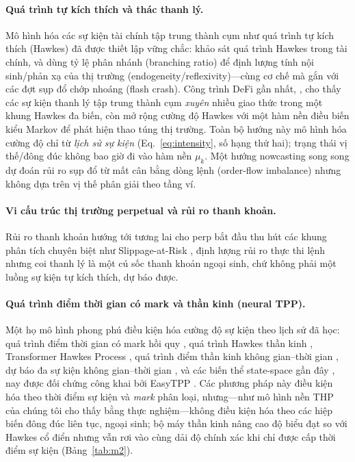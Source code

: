 \documentclass[11pt,a4paper]{article}
\begin{document}
\paragraph{Quá trình tự kích thích và thác thanh lý.} Mô hình hóa các sự kiện tài chính tập trung thành cụm như quá trình tự kích thích (Hawkes) đã được thiết lập vững chắc: \citet{bacry2015hawkes} khảo sát quá trình Hawkes trong tài chính, và \citet{hardiman2013endogeneity} dùng tỷ lệ phân nhánh (branching ratio) để định lượng tính nội sinh/phản xạ của thị trường (endogeneity/reflexivity)---cùng cơ chế mà \citet{filimonov2012reflexivity} gắn với các đợt sụp đổ chớp nhoáng (flash crash). Công trình DeFi gần nhất, \citet{cao2025defi}, cho thấy các sự kiện thanh lý tập trung thành cụm \emph{xuyên} nhiều giao thức trong một khung Hawkes đa biến, còn \citet{markovhawkes2025manipulation} mở rộng cường độ Hawkes với một hàm nền điều biến kiểu Markov để phát hiện thao túng thị trường. Toàn bộ hướng này mô hình hóa cường độ chỉ từ \emph{lịch sử sự kiện} (Eq.~\eqref{eq:intensity}, số hạng thứ hai); trạng thái vị thế/đông đúc không bao giờ đi vào hàm nền $\mu_k$. Một hướng nowcasting song song \citep{nowcast2023crashrisk} dự đoán rủi ro sụp đổ từ mất cân bằng dòng lệnh (order-flow imbalance) nhưng không dựa trên vị thế phân giải theo tầng ví.

\paragraph{Vi cấu trúc thị trường perpetual và rủi ro thanh khoản.} Rủi ro thanh khoản hướng tới tương lai cho perp bắt đầu thu hút các khung phân tích chuyên biệt như Slippage-at-Risk \citep{slippageatrisk2026}, định lượng rủi ro thực thi lệnh nhưng coi thanh lý là một cú sốc thanh khoản ngoại sinh, chứ không phải một luồng sự kiện tự kích thích, dự báo được.

\paragraph{Quá trình điểm thời gian có mark và thần kinh (neural TPP).} Một họ mô hình phong phú điều kiện hóa cường độ sự kiện theo lịch sử đã học: quá trình điểm thời gian có mark hồi quy \citep{du2016rmtpp}, quá trình Hawkes thần kinh \citep{mei2017neuralhawkes}, Transformer Hawkes Process \citep{zuo2020thp}, quá trình điểm thần kinh không gian--thời gian \citep{zhou2022neuralstpp}, dự báo đa sự kiện không gian--thời gian \citep{beyondhawkes2022}, và các biến thể state-space gần đây \citep{mambahawkes2024}, nay được đối chứng công khai bởi EasyTPP \citep{xue2023easytpp}. Các phương pháp này điều kiện hóa theo thời điểm sự kiện và \emph{mark} phân loại, nhưng---như mô hình nền THP của chúng tôi cho thấy bằng thực nghiệm---không điều kiện hóa theo các hiệp biến đông đúc liên tục, ngoại sinh; bộ máy thần kinh nâng cao độ biểu đạt so với Hawkes cổ điển nhưng vẫn rơi vào cùng dải độ chính xác khi chỉ được cấp thời điểm sự kiện (Bảng~\ref{tab:m2}).
\end{document}

